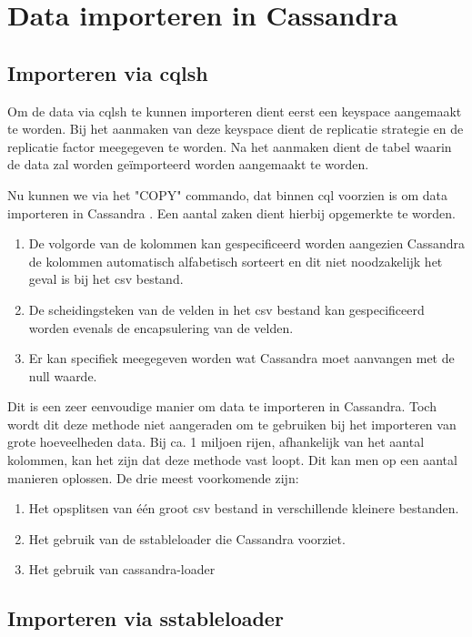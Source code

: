 \chapter{Data importeren in Cassandra}
\label{ch:cassandra_import}

\section{Importeren via cqlsh}
Om de data via cqlsh te kunnen importeren dient eerst een keyspace aangemaakt te worden.
Bij het aanmaken van deze keyspace dient de replicatie strategie en de replicatie factor meegegeven te worden.
Na het aanmaken dient de tabel waarin de data zal worden geïmporteerd worden aangemaakt te worden.

Nu kunnen we via het "COPY" commando, dat binnen cql voorzien is om data importeren in Cassandra \citep{Cannon2012Import}.
Een aantal zaken dient hierbij opgemerkte te worden.

\begin{enumerate}
	\item De volgorde van de kolommen kan gespecificeerd worden aangezien Cassandra de kolommen automatisch alfabetisch sorteert en dit niet noodzakelijk het geval is bij het csv bestand.
	\item De scheidingsteken van de velden in het csv bestand kan gespecificeerd worden evenals de encapsulering van de velden.
	\item Er kan specifiek meegegeven worden wat Cassandra moet aanvangen met de null waarde.
\end{enumerate}

Dit is een zeer eenvoudige manier om data te importeren in Cassandra.
Toch wordt dit deze methode niet aangeraden om te gebruiken bij het importeren van grote hoeveelheden data.
Bij ca. 1 miljoen rijen, afhankelijk van het aantal kolommen, kan het zijn dat deze methode vast loopt.
Dit kan men op een aantal manieren oplossen.
De drie meest voorkomende zijn:

\begin{enumerate}
	\item Het opsplitsen van één groot csv bestand in verschillende kleinere bestanden.
	\item Het gebruik van de sstableloader die Cassandra voorziet.
	\item Het gebruik van cassandra-loader
\end{enumerate}

\section{Importeren via sstableloader}

